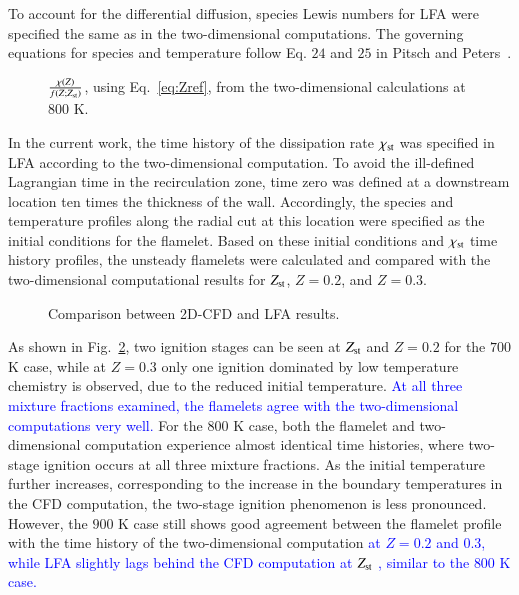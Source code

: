 \documentclass[review,3p,times]{elsarticle}
\begin{document}
To account for the differential diffusion, species Lewis numbers for LFA  were specified the same as in the two-dimensional computations.  The governing equations for species and temperature follow Eq. $24$ and $25$ in Pitsch and Peters~\cite{pitsch98b}.

\begin{figure}
  \centering
  \scriptsize
  
  \normalsize
  \caption{$\frac{\chi(Z)}{f(Z;Z_{\rm st})}$, using Eq.~\ref{eq:Zref}, from the two-dimensional calculations at $800$ K.}
  \label{fig:Zref}
\end{figure}

In the current work, the time history of the dissipation rate $\chi_{\rm st}$ was specified in LFA according to the two-dimensional computation.  To avoid the ill-defined Lagrangian time in the recirculation zone, time zero was defined at a downstream location ten times the thickness of the wall.  Accordingly, the species and temperature profiles along the radial cut at this location were specified as the initial conditions for the flamelet.  Based on these initial conditions and $\chi_{\rm st}$ time history profiles, the unsteady flamelets were calculated and compared with the two-dimensional computational results for $Z_{\rm st}$, $Z = 0.2$, and $Z = 0.3$.       

\begin{figure}
  \centering
  \scriptsize
  
  \normalsize
  \caption{Comparison between 2D-CFD and LFA results.}
  \label{fig:LFA}
\end{figure}

As shown in Fig.~\ref{fig:LFA}, two ignition stages can be seen at $Z_{\rm st}$ and $Z = 0.2$ for the $700$ K case, while at $Z = 0.3$ only one ignition dominated by low temperature chemistry is observed, due to the reduced initial temperature.   \textcolor{blue}{At all three mixture fractions examined, the flamelets agree with the two-dimensional computations very well.}  For the $800$ K case, both the flamelet and two-dimensional computation experience almost identical time histories, where two-stage ignition occurs at all three mixture fractions.  As the initial temperature further increases, corresponding to the increase in the boundary temperatures in the CFD computation, the two-stage ignition phenomenon is less pronounced.  However, the $900$ K case still shows good agreement between the flamelet profile with the time history of the two-dimensional computation \textcolor{blue}{at $Z = 0.2$ and $0.3$, while LFA slightly lags behind the CFD computation at $Z_{\rm st}$ , similar to the $800$ K case.}
  
\end{document}
